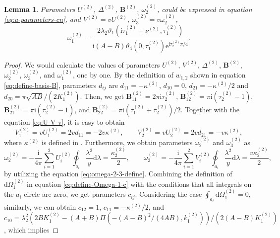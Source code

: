 \documentclass[11pt,reqno]{amsart}
\newcommand{\ii}{\mathrm{i}}
\newcommand{\ee}{\mathrm{e}}
\newcommand{\dd}{\mathrm{d}}
\newtheorem{lemma}{Lemma}
\numberwithin{equation}{section}
\begin{document}
\begin{lemma}\label{lemma:U-V-R-cn}
	Parameters $U^{(2)}$, $\Delta^{(2)}$, $\mathbf{B}^{(2)}$, $\omega_2^{(2)}$, could be expressed in equation \eqref{eq:u-parameters-cn}, and $V^{(2)}=vU^{(2)}$, $\omega_3^{(2)}=v\omega_2^{(2)}$,
	\begin{equation}\nonumber
		\omega_1^{(2)} = \frac{2\lambda_2\vartheta_1(\ii \tau^{(2)}_1+ \nu^{(2)},\tau^{(2)}_1)}{\ii(A-B)\vartheta_4(0,\tau^{(2)}_1)\ee^{\ii \tau^{(2)}_2\pi/4}}.
	\end{equation}
\end{lemma}

\begin{proof}
	We would calculate the values of parameters $U^{(2)}$, $V^{(2)}$, $\Delta^{(2)}$, $\mathbf{B}^{(2)}$, $\omega_2^{(2)}$, $\omega_3^{(2)}$,  and $\omega_1^{(2)}$, one by one.
	By the definition of $w_{1,2}$ shown in equation \eqref{eq:define-basis-B}, parameters $d_{ij}$ are $d_{11}=-\kappa^{(2)}$, $d_{10}=0$, $d_{21}=-\kappa^{(2)}/2$ and $d_{20}=\pi \sqrt{AB}/(2  K^{(2)}_1)$.
	Then, we get $
	\mathbf{B}^{(2)}_{11}=2\pi \ii \tau^{(2)}_2$, 
	$\mathbf{B}^{(2)}_{12}=\pi \ii (\tau^{(2)}_2-1)$, 
	$\mathbf{B}^{(2)}_{21}=\pi \ii (\tau^{(2)}_2-1)$, and
	$\mathbf{B}^{(2)}_{22}=\pi \ii (\tau^{(2)}_1+\tau^{(2)}_2)/2$.
	Together with the equation \eqref{eq:U-V-v}, it is easy to obtain 
	\begin{equation}\label{eq:define-U-1-2-C}
		V_1^{(2)}=vU_1^{(2)}=2vd_{11}
		=-2v\kappa^{(2)}, \qquad  
		V_2^{(2)}=vU_2^{(2)}=2vd_{21}
		=-v\kappa^{(2)}, 
	\end{equation}
	where $\kappa^{(2)}$ is defined in .
	Furthermore, we obtain parameters $\omega_2^{(2)} $ and $\omega_3^{(2)} $ as 
	\begin{equation}\label{eq:define-omega-2-3-C}
		\omega_2 ^{(2)}
		=-\frac{\ii}{4\pi} \sum_{i=1}^{2}U_i^{(2)} \oint_{a_i}\frac{\lambda^2}{y}\dd \lambda=\frac{\kappa^{(2)}_2}{2}, \qquad 
		\omega_3^{(2)} 
		=-\frac{\ii}{4\pi} \sum_{i=1}^{2}V_i^{(2)} \oint_{a_i}\frac{\lambda^2}{y}\dd \lambda=\frac{v\kappa^{(2)}_2}{2},
	\end{equation}
	by utilizing the equation \eqref{eq:omega-2-3-define}.
	Combining the definition of $\dd \Omega_{1}^{(2)}$ in equation \eqref{eq:define-Omega-1-c} with the conditions that all integrals on the $a_i$-circle are zero, 
	we get parameters $c_{ij}$.
	Considering the case $\oint_{a_i}\dd \Omega_1^{(2)}=0$, similarly, we can obtain $c_{12}=1$, $c_{11}=-\kappa^{(2)}/2$, and $c_{10}=\lambda_2^2(2B  K^{(2)}_1-(A+B)\Pi(-(A-B)^2/(4AB),  k^{(2)}_1))/(2(A-B)  K^{(2)}_1)$, which implies 

\end{proof}
\end{document}
